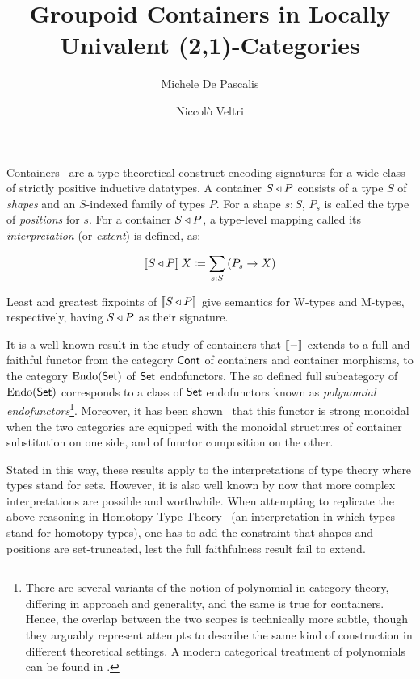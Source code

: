 \documentclass[a4paper]{easychair}
\title{Groupoid Containers in Locally Univalent (2,1)-Categories}
\author{ Michele De Pascalis\inst{1} \and Niccol{\`o} Veltri\inst{2} }
\institute{
  Tallinn University of Technology, Estonia \email{michde@taltech.ee} \and
  Tallinn University of Technology, Estonia \email{niccolo@cs.ioc.ee}
}
\begin{document}
\maketitle

\vspace{1.2em}

Containers~\cite{Abbott2005} are a type-theoretical construct encoding
signatures for a wide class of strictly positive inductive datatypes. A
container \(S \mathbin{\triangleleft} P\) consists of a type \(S\) of \emph{shapes} and an
\(S\)-indexed family of types \(P\). For a shape \(s : S\), \(P_s\) is called
the type of \emph{positions} for \(s\). For a container \(S \mathbin{\triangleleft} P\), a
type-level mapping called its \emph{interpretation} (or \emph{extent}) is
defined, as:

\[
  \ext{\cont{S}{P}} \, X \defas \theext{S}{P}{X}
\]

Least and greatest fixpoints of \(\llbracket{S \mathbin{\triangleleft} P}\rrbracket\) give semantics for W-types
and M-types, respectively, having \(S \mathbin{\triangleleft} P\) as their signature.

It is a well known result in the study of containers that \(\llbracket{-}\rrbracket\) extends to
a full and faithful functor from the category \(\mathsf{Cont}\) of containers and
container morphisms, to the category \(\operatorname{Endo}(\mathsf{Set})\) of \(\mathsf{Set}\) endofunctors.
The so defined full subcategory of \(\operatorname{Endo}(\mathsf{Set})\) corresponds to a class of
\(\mathsf{Set}\) endofunctors known as \emph{polynomial endofunctors}\footnote{There are
several variants of the notion of polynomial in category theory, differing in
approach and generality, and the same is true for containers. Hence, the overlap
between the two scopes is technically more subtle, though they arguably
represent attempts to describe the same kind of construction in different
theoretical settings. A modern categorical treatment of polynomials can be found
in \cite{Gambino2009}.}. Moreover, it has been shown~\cite{Uustalu2017} that
this functor is strong monoidal when the two categories are equipped with the
monoidal structures of container substitution on one side, and of functor
composition on the other.

Stated in this way, these results apply to the interpretations of type theory
where types stand for sets. However, it is also well known by now that more
complex interpretations are possible and worthwhile. When attempting to
replicate the above reasoning in Homotopy Type
Theory~\cite{UnivalentFoundationsProgram2013} (an interpretation in which types
stand for homotopy types), one has to add the constraint that shapes and
positions are set-truncated, lest the full faithfulness result fail to extend.
\end{document}
